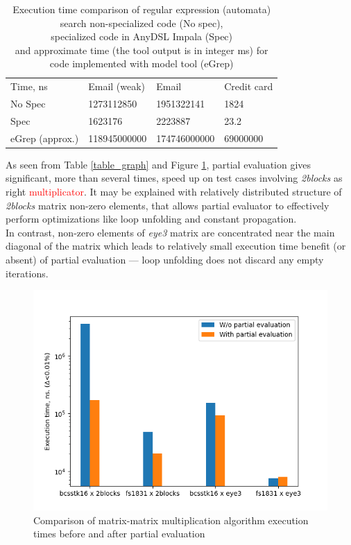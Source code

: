 \documentclass[conference]{IEEEtran}
\begin{document}
\begin{table}[]
	\begin{tabular}{llll}
		Time, ns        & Email (weak) & Email        & Credit card \\
		No Spec         & 1273112850   & 1951322141   & 1824        \\
		Spec            & 1623176      & 2223887      & 23.2        \\
		eGrep (approx.) & 118945000000 & 174746000000 & 69000000          
	\end{tabular}
	\centering
	\caption{Execution time comparison of regular expression (automata) search non-specialized code (No spec),\\ specialized code in AnyDSL Impala (Spec) \\ and approximate time (the tool output is in integer ms) for code implemented with model tool (eGrep)}
	\label{table_regex}
\end{table}

As seen from Table \ref{table_graph} and Figure \ref{fig:multpe}, partial evaluation gives significant, more than several times, speed up on test cases involving \textit{2blocks} as right \textcolor{red}{multiplicator}. It may be explained with relatively distributed structure of \textit{2blocks} matrix non-zero elements, that allows partial evaluator to effectively perform optimizations like loop unfolding and constant propagation.\\
In contrast, non-zero elements of \textit{eye3} matrix are concentrated near the main diagonal of the matrix which leads to relatively small execution time benefit (or absent) of partial evaluation --- loop unfolding does not discard any empty iterations.

\begin{figure}[H]
	\centering
	\includegraphics[scale=0.6]{matrix-mult}
	\caption{Comparison of matrix-matrix multiplication algorithm execution times before and after partial evaluation}
	\label{fig:multpe}
\end{figure}
\end{document}
